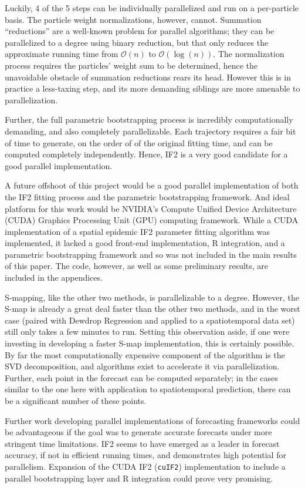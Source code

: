 	Luckily, 4 of the 5 steps can be individually parallelized and run on a per-particle basis. The particle weight normalizations, however, cannot. Summation ``reductions'' are a well-known problem for parallel algorithms; they can be parallelized to a degree using binary reduction, but that only reduces the approximate running time from $\mathcal{O}(n)$ to $\mathcal{O}(\log(n))$. The normalization process requires the particles' weight sum to be determined, hence the unavoidable obstacle of summation reductions rears its head. However this is in practice a less-taxing step, and its more demanding siblings are more amenable to parallelization.

	Further, the full parametric bootstrapping process is incredibly computationally demanding, and also completely parallelizable. Each trajectory requires a fair bit of time to generate, on the order of of the original fitting time, and can be computed completely independently. Hence, IF2 is a very good candidate for a good parallel implementation.

	A future offshoot of this project would be a good parallel implementation of both the IF2 fitting process and the parametric bootstrapping framework. And ideal platform for this work would be NVIDIA's Compute Unified Device Architecture (CUDA) Graphics Processing Unit (GPU) computing framework. While a CUDA implementation of a spatial epidemic IF2 parameter fitting algorithm was implemented, it lacked a good front-end implementation, R integration, and a parametric bootstrapping framework and so was not included in the main results of this paper. The code, however, as well as some preliminary results, are included in the appendices.

	S-mapping, like the other two methods, is parallelizable to a degree. However, the S-map is already a great deal faster than the other two methods, and in the worst case (paired with Dewdrop Regression and applied to a spatiotemporal data set) still only takes a few minutes to run. Setting this observation aside, if one were investing in developing a faster S-map implementation, this is certainly possible. By far the most computationally expensive component of the algorithm is the SVD decomposition, and algorithms exist to accelerate it via parallelization. Further, each point in the forecast can be computed separately; in the cases similar to the one here with application to spatiotemporal prediction, there can be a significant number of these points.

	Further work developing parallel implementations of forecasting frameworks could be advantageous if the goal was to generate accurate forecasts under more stringent time limitations. IF2 seems to have emerged as a leader in forecast accuracy, if not in efficient running times, and demonstrates high potential for parallelism. Expansion of the CUDA IF2 (\texttt{cuIF2}) implementation to include a parallel bootstrapping layer and R integration could prove very promising.


